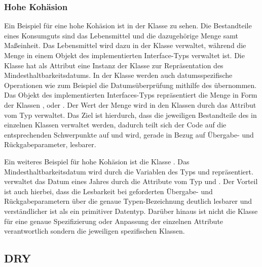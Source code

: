 \subsubsection*{Hohe Kohäsion}
Ein Beispiel für eine hohe Kohäsion ist in der Klasse \href{}{\code{}} zu sehen.
Die Bestandteile eines Konsumguts sind das Lebensmittel und die dazugehörige Menge samt Maßeinheit.
Das Lebensmittel wird dazu in der Klasse \href{}{\code{}} verwaltet, während die Menge in einem Objekt des implementierten Interface-Typs \href{}{\code{}} verwaltet ist.
Die Klasse \href{}{\code{}} hat als Attribut eine Instanz der Klasse \href{}{\code{}} zur Repräsentation des Mindesthaltbarkeitsdatums.
In der Klasse \href{}{\code{}} werden auch datumsspezifische Operationen wie zum Beispiel die Datumsüberprüfung mithilfe des \href{}{\code{}} übernommen.
Das Objekt des implementierten Interfaces-Typs \href{}{\code{}} repräsentiert die Menge in Form der Klassen \href{}{\code{}}, \href{}{\code{}} oder \href{}{\code{}}.
Der Wert der Menge wird in den Klassen durch das Attribut vom Typ \href{}{\code{}} verwaltet.
Das Ziel ist hierdurch, dass die jeweiligen Bestandteile des \href{}{\code{}} in einzelnen Klassen verwaltet werden, dadurch teilt sich der Code auf die entsprechenden Schwerpunkte auf und wird, gerade in Bezug auf Übergabe- und Rückgabeparameter, lesbarer.

Ein weiteres Beispiel für hohe Kohäsion ist die Klasse \href{}{\code{}}.
Das Mindesthaltbarkeitsdatum wird durch die Variablen des Typs \href{}{\code{}} und \href{}{\code{}} repräsentiert.
\href{}{\code{}} verwaltet das Datum eines Jahres durch die Attribute vom Typ  und .
Der Vorteil ist auch hierbei, dass die Lesbarkeit bei geforderten Übergabe- und Rückgabeparametern über die genaue Typen-Bezeichnung deutlich lesbarer und verständlicher ist als ein primitiver Datentyp.
Darüber hinaus ist nicht die Klasse \href{}{\code{}} für eine genaue Spezifizierung oder Anpassung der einzelnen Attribute verantwortlich sondern die jeweiligen spezifischen Klassen.

\subsection{\ac{DRY}}

